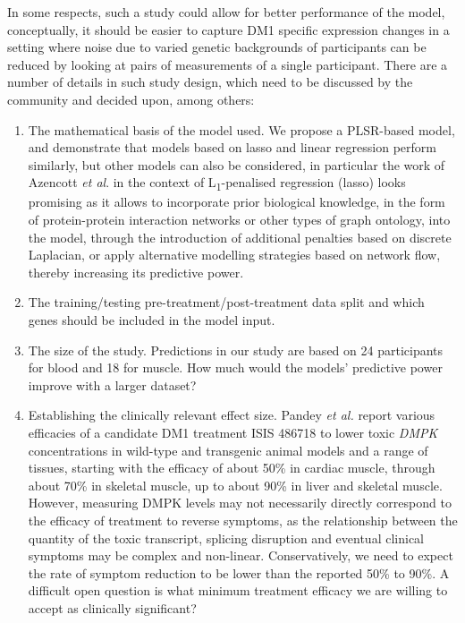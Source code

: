 \documentclass[10pt,letterpaper]{article}
\begin{document}
In some respects, such a study could allow for better performance of the model, conceptually, it should be easier to capture DM1 specific expression changes in a setting where noise due to varied genetic backgrounds of participants can be reduced by looking at pairs of measurements of a single participant. There are a number of details in such study design, which need to be discussed by the community and decided upon, among others:
\begin{enumerate}
\item The mathematical basis of the model used. We propose a PLSR-based model, and demonstrate that models based on lasso and linear regression perform similarly, but other models can also be considered, in particular the work of Azencott {\it et al}. \cite{Azencott2013} in the context of L\textsubscript{1}-penalised regression (lasso) looks promising as it allows to incorporate prior biological knowledge, in the form of protein-protein interaction networks or other types of graph ontology, into the model, through the introduction of additional penalties based on discrete Laplacian, or apply alternative modelling strategies based on network flow, thereby increasing its predictive power.
\item The training/testing pre-treatment/post-treatment data split and which genes should be included in the model input.
\item The size of the study. Predictions in our study are based on 24 participants for blood and 18 for muscle. How much would the models' predictive power improve with a larger dataset?
\item Establishing the clinically relevant effect size. Pandey {\it et al.} \cite{Pandey2015} report various efficacies of a candidate DM1 treatment ISIS 486718 to lower toxic {\it DMPK} concentrations in wild-type and transgenic animal models and a range of tissues, starting with the efficacy of about 50\% in cardiac muscle, through about 70\% in skeletal muscle, up to about 90\% in liver and skeletal muscle. However, measuring DMPK levels may not necessarily directly correspond to the efficacy of treatment to reverse symptoms, as the relationship between the quantity of the toxic transcript, splicing disruption and eventual clinical symptoms may be complex and non-linear. Conservatively, we need to expect the rate of symptom reduction to be lower than the reported 50\% to 90\%. A difficult open question is what minimum treatment efficacy we are willing to accept as clinically significant?
\end{enumerate}
\end{document}
